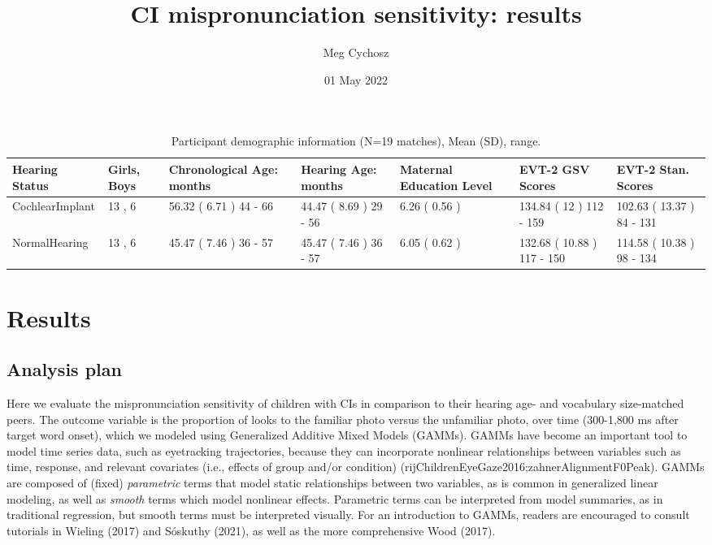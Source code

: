\documentclass[
]{article}
\title{CI mispronunciation sensitivity: results}
\author{Meg Cychosz}
\date{01 May 2022}
\begin{document}
\maketitle

\begin{table}[!h]

\caption{\label{tab:demo-tab}Participant demographic information (N=19 matches), Mean (SD), range.}
\centering
\begin{tabular}[t]{lllllll}
\toprule
Hearing Status & Girls, Boys & Chronological Age: months & Hearing Age: months & Maternal Education Level & EVT-2 GSV Scores & EVT-2 Stan. Scores\\
\midrule
CochlearImplant & 13 , 6 & 56.32 ( 6.71 ) 44 - 66 & 44.47 ( 8.69 ) 29 - 56 & 6.26 ( 0.56 ) & 134.84 ( 12 ) 112 - 159 & 102.63 ( 13.37 ) 84 - 131\\
NormalHearing & 13 , 6 & 45.47 ( 7.46 ) 36 - 57 & 45.47 ( 7.46 ) 36 - 57 & 6.05 ( 0.62 ) & 132.68 ( 10.88 ) 117 - 150 & 114.58 ( 10.38 ) 98 - 134\\
\bottomrule
\end{tabular}
\end{table}

\hypertarget{results}{%
\section{Results}\label{results}}

\hypertarget{analysis-plan}{%
\subsection{Analysis plan}\label{analysis-plan}}

Here we evaluate the mispronunciation sensitivity of children with CIs in comparison to their hearing age- and vocabulary size-matched peers. The outcome variable is the proportion of looks to the familiar photo versus the unfamiliar photo, over time (300-1,800 ms after target word onset), which we modeled using Generalized Additive Mixed Models (GAMMs). GAMMs have become an important tool to model time series data, such as eyetracking trajectories, because they can incorporate nonlinear relationships between variables such as time, response, and relevant covariates (i.e., effects of group and/or condition) (rijChildrenEyeGaze2016;zahnerAlignmentF0Peak). GAMMs are composed of (fixed) \emph{parametric} terms that model static relationships between two variables, as is common in generalized linear modeling, as well as \emph{smooth} terms which model nonlinear effects. Parametric terms can be interpreted from model summaries, as in traditional regression, but smooth terms must be interpreted visually. For an introduction to GAMMs, readers are encouraged to consult tutorials in Wieling (2017) and Sóskuthy (2021), as well as the more comprehensive Wood (2017).
\end{document}

